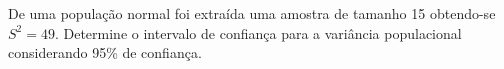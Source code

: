 %
%


\begin{exercicioBanco}[\valorquestao]
    De uma população normal foi extraída uma amostra de tamanho 15 obtendo-se \(S^{2} = 49\). Determine o intervalo de confiança para a variância populacional considerando 95\% de confiança.
\end{exercicioBanco}

